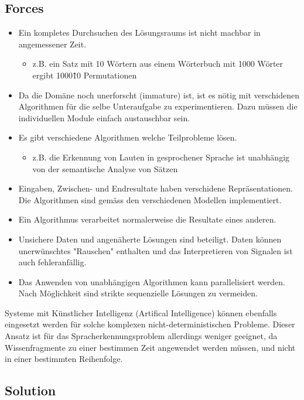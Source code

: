 \subsection*{Forces}


\begin{itemize}
	\item Ein kompletes Durchsuchen des Lösungsraums ist nicht machbar in angemessener Zeit.
	\begin{itemize}
		\item z.B. ein Satz mit 10 Wörtern aus einem Wörterbuch mit 1000 Wörter ergibt 1000\^10 Permutationen
	\end{itemize}
	\item Da die Domäne noch unerforscht (immature) ist, ist es nötig mit verschidenen Algorithmen für die selbe Unteraufgabe zu experimentieren. Dazu müssen die individuellen Module einfach austauschbar sein.
	\item Es gibt verschiedene Algorithmen welche Teilprobleme lösen.
	\begin{itemize}
		\item z.B. die Erkennung von Lauten in gesprochener Sprache ist unabhängig von der semantische Analyse von Sätzen
	\end{itemize}
	\item Eingaben, Zwischen- und Endresultate haben verschidene Repräsentationen. Die Algorithmen sind gemäss den verschiedenen Modellen implementiert.
	\item Ein Algorithmus verarbeitet normalerweise die Resultate eines anderen.
	\item Unsichere Daten und angenäherte Lösungen sind beteiligt. Daten können unerwünschtes "Rauschen" enthalten und das Interpretieren von Signalen ist auch fehleranfällig.
	\item Das Anwenden von unabhängigen Algorithmen kann parallelisiert werden. Nach Möglichkeit sind strikte sequenzielle Lösungen zu vermeiden.
\end{itemize}

Systeme mit Künstlicher Intelligenz (Artifical Intelligence) können ebenfalls eingesetzt werden für solche komplexen nicht-deterministischen Probleme. Dieser Ansatz ist für das Spracherkennungsproblem allerdings weniger geeignet, da Wissenfragmente zu einer bestimmen Zeit angewendet werden müssen, und nicht in einer bestimmten Reihenfolge.

\subsection*{Solution}


